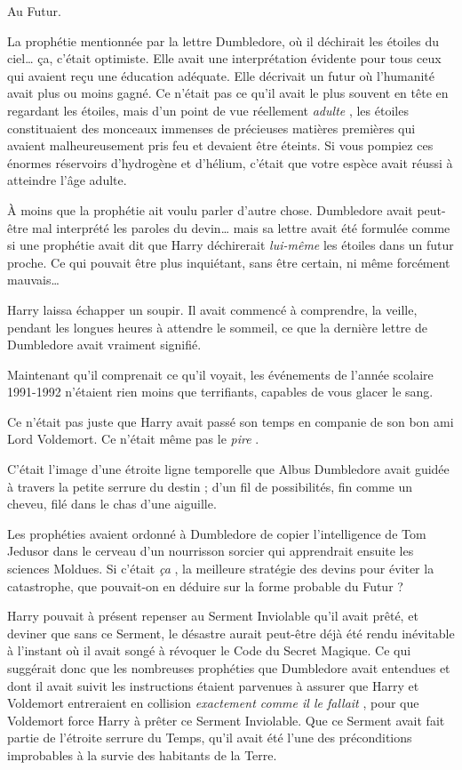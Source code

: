 Au Futur.

La prophétie mentionnée par la lettre Dumbledore, où il déchirait les étoiles du ciel… ça, c'était optimiste. Elle avait une interprétation évidente pour tous ceux qui avaient reçu une éducation adéquate. Elle décrivait un futur où l'humanité avait plus ou moins gagné. Ce n'était pas ce qu'il avait le plus souvent en tête en regardant les étoiles, mais d'un point de vue réellement \emph{adulte} , les étoiles constituaient des monceaux immenses de précieuses matières premières qui avaient malheureusement pris feu et devaient être éteints. Si vous pompiez ces énormes réservoirs d'hydrogène et d'hélium, c'était que votre espèce avait réussi à atteindre l'âge adulte.

À moins que la prophétie ait voulu parler d'autre chose. Dumbledore avait peut-être mal interprété les paroles du devin… mais sa lettre avait été formulée comme si une prophétie avait dit que Harry déchirerait \emph{lui-même}  les étoiles dans un futur proche. Ce qui pouvait être plus inquiétant, sans être certain, ni même forcément mauvais…

Harry laissa échapper un soupir. Il avait commencé à comprendre, la veille, pendant les longues heures à attendre le sommeil, ce que la dernière lettre de Dumbledore avait vraiment signifié.

Maintenant qu'il comprenait ce qu'il voyait, les événements de l'année scolaire 1991-1992 n'étaient rien moins que terrifiants, capables de vous glacer le sang.

Ce n'était pas juste que Harry avait passé son temps en companie de son bon ami Lord Voldemort. Ce n'était même pas le \emph{pire} .

C'était l'image d'une étroite ligne temporelle que Albus Dumbledore avait guidée à travers la petite serrure du destin ; d'un fil de possibilités, fin comme un cheveu, filé dans le chas d'une aiguille.

Les prophéties avaient ordonné à Dumbledore de copier l'intelligence de Tom Jedusor dans le cerveau d'un nourrisson sorcier qui apprendrait ensuite les sciences Moldues. Si c'était \emph{ça} , la meilleure stratégie des devins pour éviter la catastrophe, que pouvait-on en déduire sur la forme probable du Futur ?

Harry pouvait à présent repenser au Serment Inviolable qu'il avait prêté, et deviner que sans ce Serment, le désastre aurait peut-être déjà été rendu inévitable à l'instant où il avait songé à révoquer le Code du Secret Magique. Ce qui suggérait donc que les nombreuses prophéties que Dumbledore avait entendues et dont il avait suivit les instructions étaient parvenues à assurer que Harry et Voldemort entreraient en collision \emph{exactement comme il le fallait} , pour que Voldemort force Harry à prêter ce Serment Inviolable. Que ce Serment avait fait partie de l'étroite serrure du Temps, qu'il avait été l'une des préconditions improbables à la survie des habitants de la Terre.

